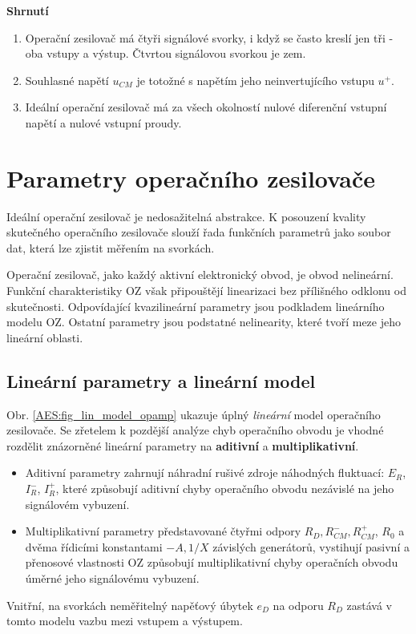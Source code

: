 {    \textbf{Shrnutí}
    \begin{enumerate}\addtolength{\itemsep}{-0.5\baselineskip}
      \item Operační zesilovač má čtyři signálové svorky, i když se často kreslí jen tři - oba 
            vstupy a výstup. Čtvrtou signálovou svorkou je zem.
      \item Souhlasné napětí $u_{CM}$ je totožné s napětím jeho neinvertujícího vstupu $u^+$.
      \item Ideální operační zesilovač má za všech okolností nulové diferenční vstupní napětí a  
            nulové vstupní proudy.
    \end{enumerate}
  
  \section{Parametry operačního zesilovače}
    Ideální operační zesilovač je nedosažitelná abstrakce. K posouzení kvality sku\-teč\-ného 
    operačního zesilovače slouží řada funkčních parametrů jako soubor dat, která lze zjistit 
    měřením na svorkách.
   
    Operační zesilovač, jako každý aktivní elektronický obvod, je obvod nelineární. Funkční 
    charakteristiky OZ však připouštějí linearizaci bez přílišného odklonu od skutečnosti. 
    Odpovídající kvazilineární parametry jsou podkladem lineárního modelu OZ. Ostatní parametry 
    jsou podstatné nelinearity, které tvoří meze jeho lineární oblasti.
    
    \subsection{Lineární parametry a lineární model}
      Obr. \ref{AES:fig_lin_model_opamp} ukazuje úplný \emph{lineární} model operačního zesilovače. 
      Se zřetelem k pozdější analýze chyb operačního obvodu je vhodné rozdělit znázorněné lineární 
      parametry na \textbf{aditivní} a \textbf{multiplikativní}.
      \begin{itemize}\addtolength{\itemsep}{-0.5\baselineskip}
        \item Aditivní parametry zahrnují náhradní rušivé zdroje náhodných fluktuací: $E_R$, 
              $I_R^-$, $I_R^+$, které způsobují aditivní chyby operačního obvodu nezávislé na jeho 
               signálovém vybuzení.
        \item Multiplikativní parametry představované čtyřmi odpory $R_D, R^-_{CM}, R^+_{CM}$,  
              $R_0$ a dvěma řídicími konstantami $-A, 1/X$ závislých generátorů, vystihují pasivní 
              a přenosové vlastnosti OZ způsobují multiplikativní chyby operačních obvodu úměrné 
              jeho signálovému vybuzení.
      \end{itemize}
      Vnitřní, na svorkách neměřitelný napěťový úbytek $e_D$ na odporu $R_D$ zastává v tomto modelu 
      vazbu mezi vstupem a výstupem.
     
}
